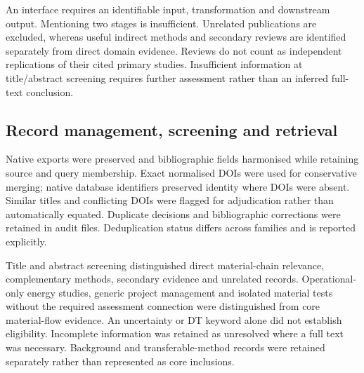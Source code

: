 An interface requires an identifiable input, transformation and downstream output. Mentioning two stages is insufficient. Unrelated publications are excluded, whereas useful indirect methods and secondary reviews are identified separately from direct domain evidence. Reviews do not count as independent replications of their cited primary studies. Insufficient information at title/abstract screening requires further assessment rather than an inferred full-text conclusion.

\subsection{Record management, screening and retrieval}
Native exports were preserved and bibliographic fields harmonised while retaining source and query membership. Exact normalised DOIs were used for conservative merging; native database identifiers preserved identity where DOIs were absent. Similar titles and conflicting DOIs were flagged for adjudication rather than automatically equated. Duplicate decisions and bibliographic corrections were retained in audit files. Deduplication status differs across families and is reported explicitly.

Title and abstract screening distinguished direct material-chain relevance, complementary methods, secondary evidence and unrelated records. Operational-only energy studies, generic project management and isolated material tests without the required assessment connection were distinguished from core material-flow evidence. An uncertainty or DT keyword alone did not establish eligibility. Incomplete information was retained as unresolved where a full text was necessary. Background and transferable-method records were retained separately rather than represented as core inclusions.

